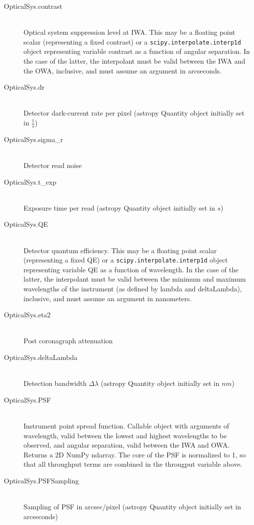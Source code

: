 \documentclass[cleanfoot]{asme2ej}
\begin{document}
\begin{itemize}
\begin{description}
        \item[OpticalSys.contrast] \hfill \\
        Optical system suppression level at IWA. This may be a floating point scalar (representing a fixed contrast) or a \verb+scipy.interpolate.interp1d+ object representing variable contrast as a function of angular separation.  In the case of the latter, the interpolant must be valid between the IWA and the OWA, inclusive, and must assume an argument in arcseconds.
        \item[OpticalSys.dr] \hfill \\
        Detector dark-current rate per pixel (astropy Quantity object initially set in $ \frac{1}{s} $)
        \item[OpticalSys.sigma\_r] \hfill \\
        Detector read noise 
        \item[OpticalSys.t\_exp] \hfill \\
        Exposure time per read (astropy Quantity object initially set in $ s $)
        \item[OpticalSys.QE] \hfill \\
        Detector quantum efficiency. This may be a floating point scalar (representing a fixed QE) or a \verb+scipy.interpolate.interp1d+ object representing variable QE as a function of wavelength.  In the case of the latter, the interpolant must be valid between the minimum and maximum wavelengths of the instrument (as defined by lambda and deltaLambda), inclusive, and must assume an argument in nanometers.
        \item[OpticalSys.eta2] \hfill \\
        Post coronagraph attenuation
        \item[OpticalSys.deltaLambda] \hfill \\
        Detection bandwidth $ \Delta\lambda $ (astropy Quantity object initially set in $ nm $)
        \item[OpticalSys.PSF] \hfill \\
        Instrument point spread function.  Callable object with arguments of wavelength, valid between the lowest and highest wavelengths to be observed, and angular separation, valid between the IWA and OWA.  Returns a 2D NumPy ndarray.  The core of the PSF is normalized to 1, so that all throughput terms are combined in the througput variable above. 
        \item[OpticalSys.PSFSampling] \hfill \\
        Sampling of PSF in arcsec/pixel (astropy Quantity object initially set in arcseconds)

\end{description}
\end{itemize}
\end{document}
